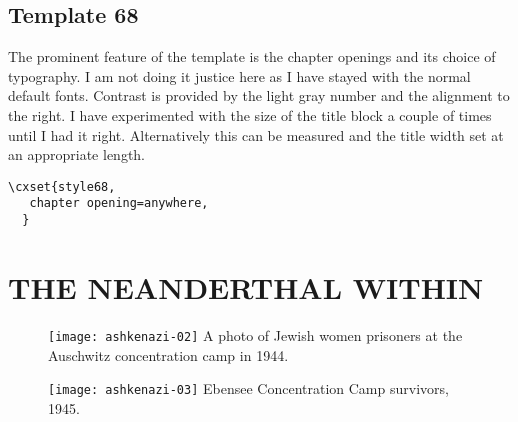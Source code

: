 \section{Template 68}

The prominent feature of the template is the chapter openings and its choice of typography. I am not doing it justice here as I have stayed with the normal default fonts. Contrast is provided by the light gray number and the alignment to the right. I have experimented with the size of the title block a couple of times until I had it right. Alternatively this can be measured and the title width set at an appropriate length.



\example
\begin{verbatim}
\cxset{style68,
   chapter opening=anywhere,
  }
\end{verbatim}

\solution
    
\chapter{THE NEANDERTHAL WITHIN}
\lorem


\begin{figure}[ht]
\centering
\texttt{[image: ashkenazi-02]}
A photo of Jewish women prisoners at the Auschwitz concentration camp in 1944. 
\medskip

\texttt{[image: ashkenazi-03]}
Ebensee Concentration Camp survivors, 1945.
\end{figure}

